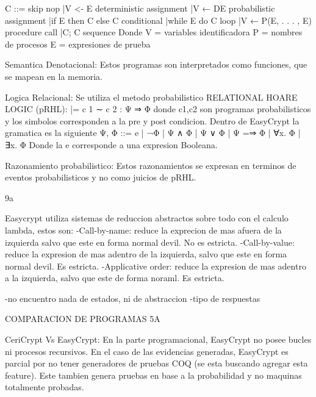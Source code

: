 \documentclass[runningheads,a4paper]{llncs}
\begin{document}
C ::= skip					nop
	|V <- E					deterministic assignment
	|V ← DE					probabilistic assignment
	|if E then C else C		conditional
	|while E do C			loop
	|V ← P(E, . . . , E)	procedure call
	|C; C					sequence
Donde V = {variables identificadora}
	P = {nombres de procesos}
	E = {expresiones de prueba}


Semantica Denotacional:
Estos programas son interpretados como funciones, que se mapean en la memoria.

Logica Relacional:
Se utiliza el metodo probabilistico RELATIONAL HOARE LOGIC (pRHL):
|= c 1 ∼ c 2 : Ψ ⇒ Φ	donde c1,c2 son programas probabilisticos y los simbolos corresponden a la pre y post condicion.
Dentro de EasyCrypt la gramatica es la siguiente
Ψ, Φ ::= e | ¬Φ | Ψ ∧ Φ | Ψ ∨ Φ | Ψ =⇒ Φ | ∀x. Φ | ∃x. Φ
Donde la e corresponde a una expresion Booleana.

Razonamiento probabilistico:
Estos razonamientos se expresan en terminos de eventos probabilisticos y no como juicios de pRHL.

9a

Easycrypt utiliza sistemas de reduccion abstractos sobre todo con el calculo lambda, estos son:
	-Call-by-name: reduce la exprecion de mas afuera de la izquierda salvo que este en forma normal devil. No es estricta.
	-Call-by-value: reduce la expresion de mas adentro de la izquierda, salvo que este en forma normal devil. Es estricta.
	-Applicative order: reduce la expresion de mas adentro a la izquierda, salvo que este de forma noraml. Es estricta.



-no encuentro nada de estados, ni de abstraccion
-tipo de respuestas


COMPARACION DE PROGRAMAS
5A

CeriCrypt Vs EasyCrypt:
En la parte programacional, EasyCrypt no posee bucles ni procesos recursivos. En el caso de las evidencias generadas, EasyCrypt es parcial por no tener generadores de pruebas COQ (se esta buscando agregar esta feature). Este tambien genera pruebas en base a la probabilidad y no maquinas totalmente probadas.
\end{document}
